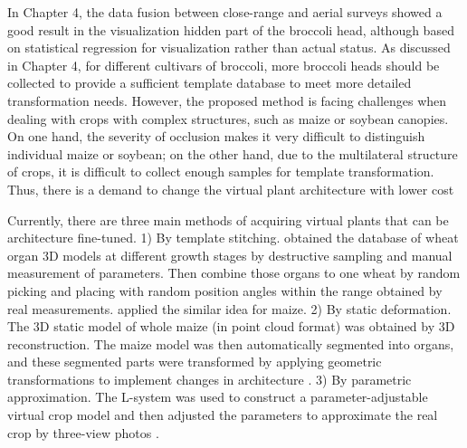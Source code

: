In Chapter 4, the data fusion between close-range and aerial surveys showed a good result in the visualization hidden part of the broccoli head, although based on statistical regression for visualization rather than actual status. As discussed in Chapter 4, for different cultivars of broccoli, more broccoli heads should be collected to provide a sufficient template database to meet more detailed transformation needs. However, the proposed method is facing challenges when dealing with crops with complex structures, such as maize or soybean canopies. On one hand, the severity of occlusion makes it very difficult to distinguish individual maize or soybean; on the other hand, due to the multilateral structure of crops, it is difficult to collect enough samples for template transformation. Thus, there is a demand to change the virtual plant architecture with lower cost 


  Currently, there are three main methods of acquiring virtual plants that can be architecture fine-tuned. 
  1) By template stitching. 
  \mbox{\citet{chang_3dcap_2022}} obtained the database of wheat organ 3D models at different growth stages by destructive sampling and manual measurement of parameters. 
  Then combine those organs to one wheat by random picking and placing with random position angles within the range obtained by real measurements. 
  \mbox{\citet{wen_3d_2021}} applied the similar idea for maize. 
  2) By static deformation. 
  The 3D static model of whole maize (in point cloud format) was obtained by 3D reconstruction. 
  The maize model was then automatically segmented into organs, 
  and these segmented parts were transformed by applying geometric transformations to implement changes in architecture \mbox{\citet{liu_canopy_2021}}. 
  3) By parametric approximation. 
  The L-system was used to construct a parameter-adjustable virtual crop model and then adjusted the parameters to approximate the real crop by three-view photos \mbox{\citet{cieslak_l-system_2021}}. 


